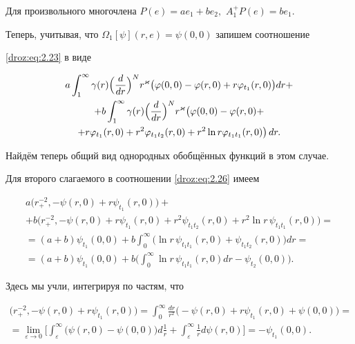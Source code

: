 Для произвольного многочлена $P(e)=ae_1+be_2,$ $A_1^+P(e)=be_1.$

Теперь, учитывая, что $\Omega_1[\psi](r,e)=\psi(0, 0)$ запишем соотношение

\eqref{droz:eq:2.23} в виде

\begin{multline*} 

a\int _1^{\infty}\gamma(r)\Bigl(\frac{d}{dr}\Bigr)^Nr^{\varkappa}\bigl(\varphi(0, 0)- \varphi(r, 0)+r\varphi_{t_1}(r, 0)\bigr)dr+

\\

+b\int _1^{\infty}\gamma(r)\Bigl(\frac{d}{dr}\Bigr)^Nr^{\varkappa} \bigl(\varphi(0,0)- \varphi(r, 0)+ \\+ r\varphi_{t_1}(r, 0)+r^2\varphi_{t_1t_2}(r,0 )+r^2\ln r\varphi_{t_1t_1}(r, 0)\bigr)\,dr.

\end{multline*}

Найдём теперь общий вид однородных обобщённых функций в этом случае.

Для второго слагаемого в соотношении \eqref{droz:eq:2.26} имеем

\begin{multline*}  

a\bigl(r_{+}^{-2},-\psi(r, 0)+r\psi_{t_1}(r, 0)\bigr)+ \\ +

b\bigl(r_{+}^{-2},-\psi(r, 0)+r\psi_{t_1}(r, 0)+r^2\psi_{t_1t_2}(r, 0)+r^2\ln r \, \psi_{t_1t_1}(r, 0)\bigr) =\\

=(a+b)\psi_{t_1}(0, 0)+b\int _0^{\infty}\bigl(\ln r \, \psi_{t_1t_1}(r, 0)+ \psi_{t_1t_2}(r, 0)\bigr)dr=\\

=(a+b)\psi_{t_1}(0, 0)+b\biggl(\int _0^{\infty}\ln r \, \psi_{t_1t_1}(r, 0)dr -\psi_{t_2}(0, 0)\biggr).

\end{multline*}

Здесь мы учли, интегрируя по частям, что

\begin{multline*}  

\bigl(r_{+}^{-2},-\psi(r,0)+r\psi_{t_1}(r,0)\bigr)=

\int _0^{\infty} \frac{dr}{r^2} \bigl(-\psi(r, 0)+r\psi_{t_1}(r, 0)+\psi(0, 0)\bigr)=\\

=\lim\limits_{\varepsilon \to 0}\biggl[\int _{\varepsilon}^{\infty}\bigl(\psi(r, 0)-\psi(0, 0)\bigr)

d\frac{1}{r}+\int _{\varepsilon}^{\infty}\frac1{r}d\psi(r, 0)\biggr]

=-\psi_{t_1}(0, 0).

\end{multline*}

